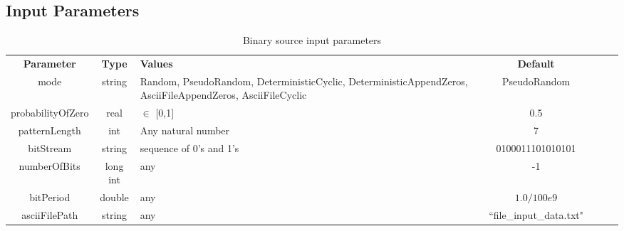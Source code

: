 \subsection*{Input Parameters}


\begin{table}[h]
	\centering
	\begin{tabular}{|c|c|p{60mm}|c|ccp{60mm}}
		\cline{1-4}
		\textbf{Parameter} & \textbf{Type} & \textbf{Values} &   \textbf{Default}& \\ \cline{1-4}
		mode & string & Random, PseudoRandom, DeterministicCyclic, DeterministicAppendZeros, AsciiFileAppendZeros, AsciiFileCyclic & PseudoRandom \\ \cline{1-4}
		probabilityOfZero & real & $\in$ [0,1] & 0.5 \\ \cline{1-4}
		patternLength & int &  Any natural number & 7 \\ \cline{1-4}
		bitStream & string & sequence of 0's and 1's & 0100011101010101 \\ \cline{1-4}
		numberOfBits & long int & any & -1 \\ \cline{1-4}
		bitPeriod & double & any & $1.0/100e9$ \\ \cline{1-4}
        asciiFilePath & string & any & ``file\_input\_data.txt" \\ \cline{1-4}
	\end{tabular}
	\caption{Binary source input parameters}
	\label{table:bin_sour_in_par}
\end{table}

